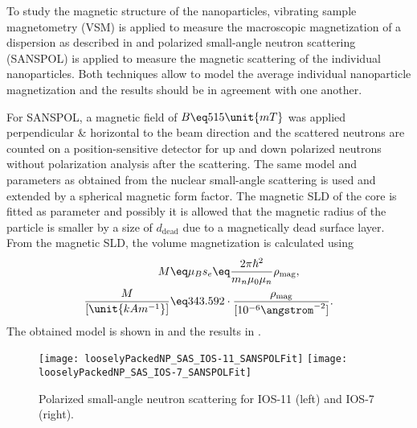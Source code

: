 \documentclass[\main/dresen_thesis.tex]{subfiles}
\begin{document}
To study the magnetic structure of the nanoparticles, vibrating sample magnetometry (VSM) is applied to measure the macroscopic magnetization of a dispersion as described in  and polarized small-angle neutron scattering (SANSPOL) is applied to measure the magnetic scattering of the individual nanoparticles.
Both techniques allow to model the average individual nanoparticle magnetization and the results should be in agreement with one another.

For SANSPOL, a magnetic field of $B\eq 515 \unit{mT}$ was applied perpendicular \& horizontal to the beam direction and the scattered neutrons are counted on a position-sensitive detector for up and down polarized neutrons without polarization analysis after the scattering.
The same model and parameters as obtained from the nuclear small-angle scattering is used and extended by a spherical magnetic form factor.
The magnetic SLD of the core is fitted as parameter and possibly it is allowed that the magnetic radius of the particle is smaller by a size of $d_\mathrm{dead}$ due to a magnetically dead surface layer.
From the magnetic SLD, the volume magnetization is calculated using 
\begin{align}
  M \eq& \mu_B s_e \eq \frac{2 \pi \hbar^2}{m_n \mu_0 \mu_n} \rho_\mathrm{mag},\\
  \frac{M}{[\unit{kA m^{-1}}]} \eq& 343.592 \cdot \frac{\rho_\mathrm{mag}}{[10^{-6} \angstrom^{-2}]}.
\end{align}
The obtained model is shown in  and the results in .

\begin{figure}[tb]
  \centering
  \texttt{[image: looselyPackedNP\_SAS\_IOS-11\_SANSPOLFit]}
  \texttt{[image: looselyPackedNP\_SAS\_IOS-7\_SANSPOLFit]}
  \caption{\label{fig:looselyPackedNP:nanoparticle:sanspol}Polarized small-angle neutron scattering for IOS-11 (left) and IOS-7 (right).}
\end{figure}
\end{document}
